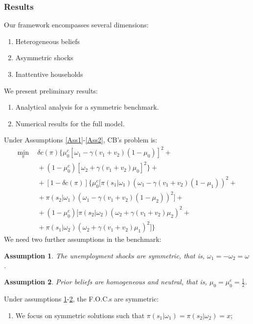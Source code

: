 \documentclass{beamer}
\newtheorem{assumption}{Assumption}
\begin{document}
\begin{frame}[allowframebreaks]
    \frametitle{Results}
    Our framework encompasses several dimensions:
    \begin{enumerate}
        \item Heterogeneous beliefs
        \item Asymmetric shocks
        \item Inattentive households
    \end{enumerate}
    \vskip10pt
    We present preliminary results:
    \begin{enumerate}
        \item Analytical analysis for a symmetric benchmark.
        \item Numerical results for the full model.
    \end{enumerate}
    \vskip10pt
    \framebreak
    Under Assumptions \ref{Ass1}-\ref{Ass2}, CB's problem is:
    \begin{equation}
    \begin{split}
        \min_{\pi} \ & \ \delta c(\pi)\Bigg\{\mu_0^c\left[\omega_1-\gamma(v_1+v_2)(1-\mu_0)\right]^2+\\
        \ & \ +(1-\mu_0^c)\left[\omega_2+\gamma(v_1+v_2)\mu_0\right]^2\Bigg\}+\\
        \ & \ +[1-\delta c(\pi)]\Bigg\{\mu_0^c\bigg[\pi(s_1|\omega_1)(\omega_1-\gamma (v_1+v_2) (1-\mu_1))^2+\\
        \ & \ +\pi(s_2|\omega_1)(\omega_1-\gamma (v_1+v_2) (1-\mu_2))^2\bigg]+ \\
        \ & \ +(1-\mu_0^c)\bigg[\pi(s_2|\omega_2)(\omega_2+\gamma (v_1+v_2) \mu_2)^2+\\
        \ & \ +\pi(s_1|\omega_2)(\omega_2+\gamma (v_1+v_2) \mu_1)^2 \bigg]\Bigg\}
    \end{split}
    \end{equation}
    We need two further assumptions in the benchmark:
    \begin{assumption}
        \label{Ass3}
        The unemployment shocks are symmetric, that is, $\omega_1=-\omega_2=\omega$.
    \end{assumption}
    \begin{assumption}
        \label{Ass4}
        Prior beliefs are homogeneous and neutral, that is, $\mu_0=\mu_0^c=\frac{1}{2}$.
    \end{assumption}
    Under assumptions \ref{Ass3}-\ref{Ass4}, the F.O.C.s are symmetric:
    \begin{enumerate}
        \item We focus on symmetric solutions such that $\pi(s_1|\omega_1)=\pi(s_2|\omega_2)=x$;

\end{enumerate}
\end{frame}
\end{document}
